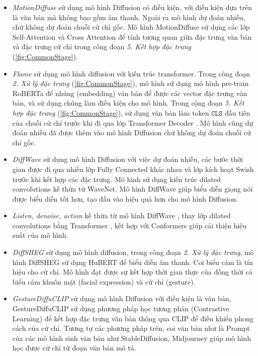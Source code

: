 \begin{itemize}
	\item \textit{MotionDiffuse} \cite{zhang2022motiondiffuse} sử dụng mô hình Diffusion có điều kiện, với điều kiện dựa trên là văn bản mà không bao gồm âm thanh. Ngoài ra mô hình dự đoán nhiễu, chứ không dự đoán chuỗi cử chỉ gốc. Mô hình MotionDiffuse sử dụng các lớp Self-Attention và Cross Attention để tính tương quan giữa đặc trưng văn bản và đặc trưng cử chỉ trong công đoạn \textit{5. Kết hợp đặc trưng} (\autoref{fig:CommonStage}).
	
	\item \textit{Flame} \cite{kim2023flame} sử dụng mô hình diffusion với kiến trúc transformer. Trong công đoạn \textit{2. Xử lý đặc trưng} (\autoref{fig:CommonStage}), mô hình sử dụng mô hình pre-train RoBERTa để nhúng (embedding) văn bản để được các vector đặc trưng văn bản, và sử dụng chúng làm điều kiện cho mô hình. 
	Trong cộng đoạn \textit{5. Kết hợp đặc trưng} (\autoref{fig:CommonStage}), sử dụng văn bản làm token $\texttt{CLS}$ đầu tiên của chuỗi cử chỉ trước khi đi qua lớp Transformer Decoder .  Mô hình cũng dự đoán nhiễu đã được thêm vào mô hình Diffusion chứ không dự đoán chuỗi cử chỉ gốc.
	
	\item \textit{DiffWave} \cite{kong2020diffwave} sử dụng mô hình Diffusion với việc dự đoán nhiễu, các bước thời gian được đi qua nhiều lớp Fully Connected khác nhau và lớp kích hoạt Swish trước khi kết hợp các đặc trưng. Mô hình sử dụng kiến trúc dilated convolutions kế thừa từ WaveNet. Mô hình DiffWave giúp biểu diễn giọng nói được biểu diễn tốt hơn, tạo đầu vào hiệu quả hơn cho mô hình Diffusion.
	
	\item \textit{Listen, denoise, action} \cite{alexanderson2022listen} kế thừa từ mô hình DiffWave \cite{kong2020diffwave}, thay lớp dilated convolutions bằng Transformer , kết hợp với Conformers giúp cải thiện hiệu suất của mô hình.
	
	\item \textit{DiffSHEG} \cite{chen2024diffsheg} sử dụng mô hình diffusion, trong công đoạn \textit{2. Xử lý đặc trưng}, mô hình DiffSHEG sử dụng HuBERT để biểu diễn âm thanh. Coi biểu cảm là tín hiệu cho cử chỉ. Mô hình đạt được sự kết hợp thời gian thực của đồng thời cả biểu cảm khuôn mặt (facial expression) và cử chỉ (gesture).
	
	\item \textit{GestureDiffuCLIP} \cite{ao2023gesturediffuclip} sử dụng mô hình Diffusion với điều kiện là văn bản, GestureDiffuCLIP sử dụng phương pháp học tương phản (Contrastive Learning) để kết hợp đặc trưng văn bản thông qua CLIP để điều khiển phong cách của cử chỉ. Tương tự các phương pháp trên, coi văn bản như là Prompt của các mô hình sinh văn bản như StableDiffusion, Midjourney giúp mô hình học được cử chỉ từ đoạn văn bản mô tả.
	

\end{itemize}
